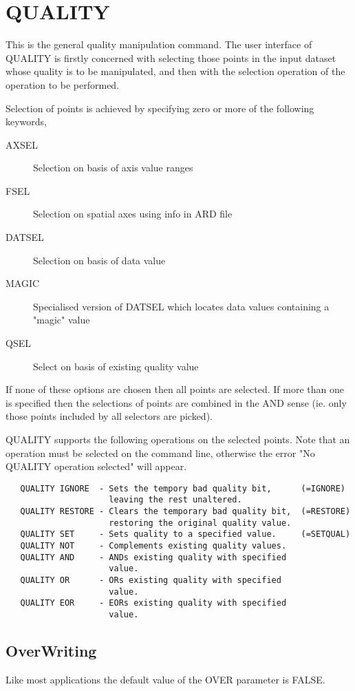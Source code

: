 \documentclass{book}
\renewcommand{\_}{{\tt\char'137}}     %
\begin{document}
\section{QUALITY}
This is the general quality manipulation command. The user interface
of QUALITY is firstly concerned with selecting those points in the
input dataset whose quality is to be manipulated, and then with the
selection operation of the operation to be performed.
 
Selection of points is achieved by specifying zero or more of the
following keywords,
 
 
\begin{description}
\item[AXSEL]
Selection on basis of axis value ranges
\item[FSEL]
Selection on spatial axes using info in ARD file
\item[DATSEL]
Selection on basis of data value
\item[MAGIC]
Specialised version of DATSEL which locates data values
containing a "magic" value
\item[QSEL]
Select on basis of existing quality value
\end{description}
If none of these options are chosen then all points are selected. If
more than one is specified then the selections of points are combined
in the AND sense (ie. only those points included by all selectors are
picked).
 
QUALITY supports the following operations on the selected points. Note
that an operation must be selected on the command line, otherwise the
error "No QUALITY operation selected" will appear.
 
\begin{verbatim}
   QUALITY IGNORE  - Sets the tempory bad quality bit,      (=IGNORE)
                     leaving the rest unaltered.
   QUALITY RESTORE - Clears the temporary bad quality bit,  (=RESTORE)
                     restoring the original quality value.
   QUALITY SET     - Sets quality to a specified value.     (=SETQUAL)
   QUALITY NOT     - Complements existing quality values.
   QUALITY AND     - ANDs existing quality with specified
                     value.
   QUALITY OR      - ORs existing quality with specified
                     value.
   QUALITY EOR     - EORs existing quality with specified
                     value.
\end{verbatim}
\subsection{OverWriting}
Like most applications the default value of the OVER
parameter is FALSE.
 
\end{document}
